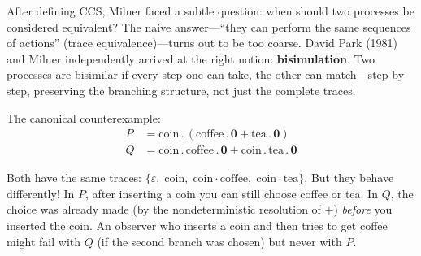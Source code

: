 \documentclass[11pt, a4paper, oneside]{book}
\newcommand{\nil}{\mathbf{0}}
\newcommand{\pref}{\mathbin{.}}
\begin{document}
\begin{historical}[title={Park and Milner}]
After defining CCS, Milner faced a subtle question: when should two
processes be considered equivalent? The naive answer---``they can perform
the same sequences of actions'' (trace equivalence)---turns out to be too
coarse. David Park (1981) and Milner independently arrived at the right
notion: \textbf{bisimulation}. Two processes are bisimilar if every step one
can take, the other can match---step by step, preserving the branching
structure, not just the complete traces.
\end{historical}

The canonical counterexample:
\begin{align*}
  P &= \text{coin} \pref (\text{coffee} \pref \nil + \text{tea} \pref \nil) \\
  Q &= \text{coin} \pref \text{coffee} \pref \nil
       + \text{coin} \pref \text{tea} \pref \nil
\end{align*}

Both have the same traces: $\{\varepsilon,\; \text{coin},\;
\text{coin}\cdot\text{coffee},\; \text{coin}\cdot\text{tea}\}$. But they behave differently! In $P$, after
inserting a coin you can still choose coffee or tea. In $Q$, the choice was
already made (by the nondeterministic resolution of $+$) \emph{before} you
inserted the coin. An observer who inserts a coin and then tries to get
coffee might fail with $Q$ (if the second branch was chosen) but never with
$P$.

\begin{center}
\end{center}
\end{document}
